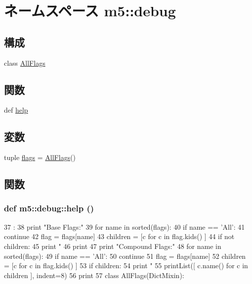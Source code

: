 \hypertarget{namespacem5_1_1debug}{
\section{ネームスペース m5::debug}
\label{namespacem5_1_1debug}
}
\subsection*{構成}
\begin{DoxyCompactItemize}
\item 
class \hyperlink{classm5_1_1debug_1_1AllFlags}{AllFlags}
\end{DoxyCompactItemize}
\subsection*{関数}
\begin{DoxyCompactItemize}
\item 
def \hyperlink{namespacem5_1_1debug_a651383f65bcec3af26db10745597f9d0}{help}
\end{DoxyCompactItemize}
\subsection*{変数}
\begin{DoxyCompactItemize}
\item 
tuple \hyperlink{namespacem5_1_1debug_a9ceb38153d5c0f156fbeada6dc00ff4f}{flags} = \hyperlink{classm5_1_1debug_1_1AllFlags}{AllFlags}()
\end{DoxyCompactItemize}


\subsection{関数}
\hypertarget{namespacem5_1_1debug_a651383f65bcec3af26db10745597f9d0}{
\subsubsection[{help}]{\setlength{\rightskip}{0pt plus 5cm}def m5::debug::help ()}}
\label{namespacem5_1_1debug_a651383f65bcec3af26db10745597f9d0}



\begin{DoxyCode}
37           :
38     print "Base Flags:"
39     for name in sorted(flags):
40         if name == 'All':
41             continue
42         flag = flags[name]
43         children = [c for c in flag.kids() ]
44         if not children:
45             print "    %
46     print
47     print "Compound Flags:"
48     for name in sorted(flags):
49         if name == 'All':
50             continue
51         flag = flags[name]
52         children = [c for c in flag.kids() ]
53         if children:
54             print "    %
55             printList([ c.name() for c in children ], indent=8)
56     print
57 
class AllFlags(DictMixin):
\end{DoxyCode}


